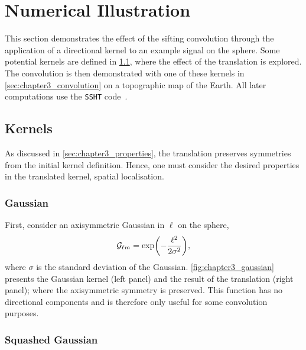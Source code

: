 \section{Numerical Illustration}\label{sec:chapter3_numerical_illustration}

This section demonstrates the effect of the sifting convolution through the application of a directional kernel to an example signal on the sphere.
Some potential kernels are defined in \cref{sec:chapter3_kernels}, where the effect of the translation is explored.
The convolution is then demonstrated with one of these kernels in \cref{sec:chapter3_convolution} on a topographic map of the Earth.
All later computations use the \texttt{SSHT} code~\cite{McEwen2011}.

\subsection{Kernels}\label{sec:chapter3_kernels}

As discussed in \cref{sec:chapter3_properties}, the translation preserves symmetries from the initial kernel definition.
Hence, one must consider the desired properties in the translated kernel, \eg{} spatial localisation.

\subsubsection{Gaussian}

First, consider an axisymmetric Gaussian in \(\ell{}\) on the sphere, \ie{}
%
\begin{equation}\label{eq:chapter3_gaussian}
    {\mathcal{G}}_{\ell m}
    = \exp(-\frac{{\ell}^{2}}{2\sigma^{2}}),
\end{equation}
%
where \(\sigma{}\) is the standard deviation of the Gaussian.
\cref{fig:chapter3_gaussian} presents the Gaussian kernel (left panel) and the result of the translation (right panel); where the axisymmetric symmetry is preserved.
This function has no directional components and is therefore only useful for some convolution purposes.



\subsubsection{Squashed Gaussian}

